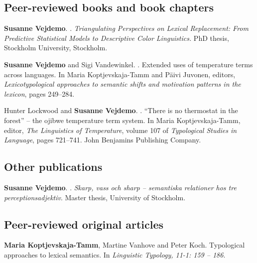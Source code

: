\documentclass[a4paper]{article}
\begin{document}
		
		\subsection*{\textbf{Peer-reviewed books and book chapters}}
	
			\textbf{Susanne Vejdemo}.
				.
					\newblock \emph{Triangulating Perspectives on Lexical Replacement: From
					  Predictive Statistical Models to Descriptive Color Linguistics.}
					\newblock PhD thesis, Stockholm University, Stockholm.
	
		
	\textbf{Susanne Vejdemo} and Sigi Vandewinkel.
	.
		\newblock Extended uses of temperature terms across languages.
		\newblock In Maria Koptjevskaja-Tamm and Päivi Juvonen, editors,
		  \emph{Lexicotypological approaches to semantic shifts and motivation patterns
		  in the lexicon}, pages 249--284. 
		  
		  
		  
		  	
		  	Hunter Lockwood and \textbf{Susanne Vejdemo}.
		  	.
		  	\newblock “There is no thermostat in the forest” – the ojibwe temperature 	  term system.
		  	\newblock In Maria Koptjevskaja-Tamm, editor, \emph{The Linguistics of
		  	  Temperature}, volume 107 of \emph{Typological Studies in Language}, pages
		  	  721--741. John Benjamins Publishing Company.
		
	
		
	
		\subsection*{\textbf{Other publications }}	
	
	
						  		
						  	\textbf{Susanne Vejdemo}.
						  	.
						  		\newblock \textit{Skarp, vass och sharp – semantiska relationer hos tre
						  		  perceptionsadjektiv}.
						  		\newblock Master thesis, University of Stockholm.
	
			
	
		
	\newpage
				\subsection*{\textbf{Peer-reviewed original articles}}	
				
				\textbf{Maria Koptjevskaja-Tamm},  Martine Vanhove and Peter Koch.
				\newblock Typological approaches to lexical semantics.
				\newblock In \textit{Linguistic Typology, 11-1: 159 – 186}.
				
\end{document}
